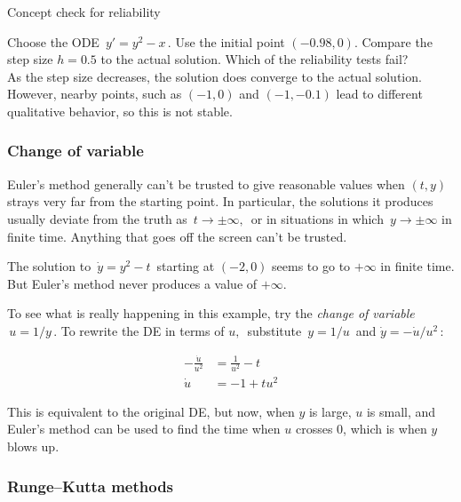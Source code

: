 \begin{exercise}
  Concept check for reliability
\end{exercise}

Choose the ODE $\, y' = y^2 - x\,$.
Use the initial point $(−0.98,0)$.
Compare the step size $h=0.5$ to the actual solution. Which of the reliability tests fail?\\

As the step size decreases,
the solution does converge to the actual solution.
However, nearby points, such as $(−1, 0)$ and $(−1, −0.1)$ lead to different qualitative behavior,
so this is not stable.

\clearpage

\subsubsection{Change of variable}

Euler's method generally can't be trusted to give reasonable values when $(t,y)$ strays very far from the starting point.
In particular, the solutions it produces usually deviate from the truth as $\, t \to  \pm \infty ,\,$ or
in situations in which $\, y \to \pm \infty$ in finite time.
Anything that goes off the screen can't be trusted.

\begin{example}
  The solution to $\, \dot y = y^2 - t\,$ starting at $(−2,0)$ seems to go to $+ \infty$ in finite time.
  But Euler's method never produces a value of $+ \infty$.
\end{example}

To see what is really happening in this example, try the \emph{\color{blue} change of variable}
$\, u = 1/y \,$.
To rewrite the DE in terms of $u, \,$ substitute $\, y = 1/u \,$ and $\dot y = - \dot u / u^2\,$:

\begin{align*}
  - \frac{\dot u}{u^2} &= \frac{1}{u^2} - t \\
  \dot u &= -1 + tu^2 
\end{align*}

This is equivalent to the original DE, but now,
when $y$ is large, $u$ is small,
and Euler's method can be used to find the time when $u$ crosses $0$,
which is when $y$ blows up.

\clearpage

\subsubsection{Runge–Kutta methods}

